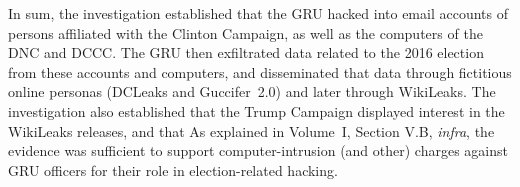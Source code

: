 \hr

In sum, the investigation established that the GRU hacked into email accounts of persons affiliated with the Clinton Campaign, as well as the computers of the DNC and DCCC\null.
The GRU then exfiltrated data related to the 2016 election from these accounts and computers, and disseminated that data through fictitious online personas (DCLeaks and Guccifer~2.0) and later through WikiLeaks.
The investigation also established that the Trump Campaign displayed interest in the WikiLeaks releases, and that 
As explained in Volume~I, Section V.B, \textit{infra}, the evidence was sufficient to support computer-intrusion (and other) charges against GRU officers for their role in election-related hacking.
